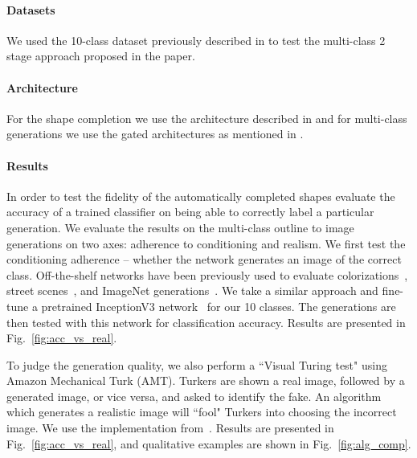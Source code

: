 \paragraph{Datasets} We used the 10-class dataset previously described in  to test the multi-class 2 stage approach proposed in the paper.
\paragraph{Architecture} For the shape completion we use the architecture described in  and for multi-class generations we use the gated architectures as mentioned in .

\paragraph{Results}
In order to test the fidelity of the automatically completed shapes evaluate the accuracy of a trained classifier on being able to correctly label a particular generation.
We evaluate the results on the multi-class outline to image generations on two axes: adherence to conditioning and realism. We first test the conditioning adherence -- whether the network generates an image of the correct class.
Off-the-shelf networks have been previously used to evaluate colorizations~\cite{zhang2016colorful}, street scenes~\cite{isola2016image2image, wang2017high}, and ImageNet generations~\cite{salimans2016improved}. 
We take a similar approach and fine-tune a pretrained InceptionV3 network~\cite{szegedy2016rethinking} for our 10 classes. 
The generations are then tested with this network for classification accuracy. Results are presented in Fig.~\ref{fig:acc_vs_real}.

To judge the generation quality, we also perform a ``Visual Turing test" using Amazon Mechanical Turk (AMT). Turkers are shown a real image, followed by a generated image, or vice versa, and asked to identify the fake. An algorithm which generates a realistic image will ``fool" Turkers into choosing the incorrect image. We use the implementation from~\cite{zhang2016colorful}.
Results are presented in Fig.~\ref{fig:acc_vs_real}, and qualitative examples are shown in Fig.~\ref{fig:alg_comp}.


